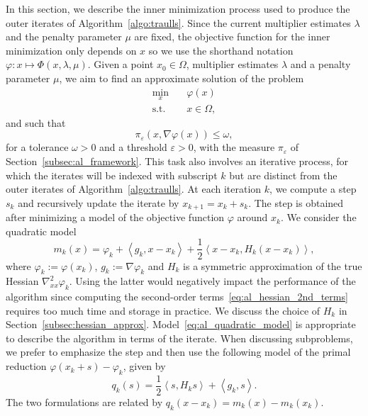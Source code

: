 \documentclass[pdflatex,sn-mathphys-num]{sn-jnl}%
\theoremstyle{thmstyleone}%
\newcommand{\inner}[2]{\left\langle {#1} , {#2} \right\rangle} %
\begin{document}
In this section, we describe the inner minimization process used to produce the outer iterates of Algorithm~\ref{algo:traulls}.
Since the current multiplier estimates $\lambda$ and the penalty parameter $\mu$ are fixed, the objective function for the inner minimization only depends on $x$ so we use the shorthand notation $\varphi : x\mapsto \Phi(x,\lambda,\mu)$.
Given a point $x_0 \in \Omega$, multiplier estimates $\lambda$ and a penalty parameter $\mu$, we aim to find an approximate solution of the problem
\begin{equation}\label{eq:inner_itr_subpb}
	\begin{aligned}
		\min_x \quad & \varphi(x)\\
		\text{s.t.} \quad & x \in \Omega,
	\end{aligned}
\end{equation}
and such that
\begin{equation*}
	\pi_\varepsilon(x,\nabla \varphi(x)) \le \omega,
\end{equation*}
for a tolerance $\omega > 0$ and a threshold $\varepsilon > 0$, with the measure $\pi_\varepsilon$ of Section~\ref{subsec:al_framework}. This task also involves an iterative process, for which the iterates will be indexed with subscript $k$ but are distinct from the outer iterates of Algorithm~\ref{algo:traulls}. At each iteration $k$, we compute a step $s_k$ and recursively update the iterate by $x_{k+1}=x_k+s_k$. The step is obtained after minimizing a model of the objective function $\varphi$ around $x_k$. We consider the quadratic model
\begin{equation}\label{eq:al_quadratic_model}
	m_k(x) = \varphi_k + \inner{g_k}{x-x_k} + \dfrac{1}{2}\inner{x-x_k}{H_k(x-x_k)},
\end{equation}
where $\varphi_k:=\varphi(x_k)$, $g_k:=\nabla \varphi_k$ and $H_k$ is a symmetric approximation of the true Hessian $\nabla^2_{xx} \varphi_k$. Using the latter would negatively impact the performance of the algorithm since computing the second-order terms~\eqref{eq:al_hessian_2nd_terms} requires too much time and storage in practice. We discuss the choice of $H_k$ in Section~\ref{subsec:hessian_approx}. 
Model~\eqref{eq:al_quadratic_model} is appropriate to describe the algorithm in terms of the iterate. When discussing subproblems, we prefer to emphasize the step and then use the following model of the primal reduction $\varphi(x_k+s)-\varphi_k$, given by
\begin{equation*}
	q_k(s) = \dfrac{1}{2}\inner{s}{H_ks} + \inner{g_k}{s}.
\end{equation*}
The two formulations are related by $q_k(x-x_k)=m_k(x)-m_k(x_k)$.
\end{document}
